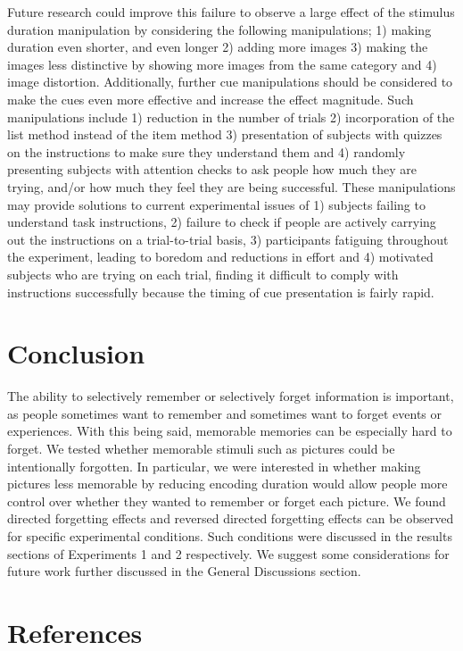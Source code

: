 \documentclass[
  english,
  man,floatsintext]{apa6}
\begin{document}
Future research could improve this failure to observe a large effect of the stimulus duration manipulation by considering the following manipulations; 1) making duration even shorter, and even longer 2) adding more images 3) making the images less distinctive by showing more images from the same category and 4) image distortion. Additionally, further cue manipulations should be considered to make the cues even more effective and increase the effect magnitude. Such manipulations include 1) reduction in the number of trials 2) incorporation of the list method instead of the item method 3) presentation of subjects with quizzes on the instructions to make sure they understand them and 4) randomly presenting subjects with attention checks to ask people how much they are trying, and/or how much they feel they are being successful. These manipulations may provide solutions to current experimental issues of 1) subjects failing to understand task instructions, 2) failure to check if people are actively carrying out the instructions on a trial-to-trial basis, 3) participants fatiguing throughout the experiment, leading to boredom and reductions in effort and 4) motivated subjects who are trying on each trial, finding it difficult to comply with instructions successfully because the timing of cue presentation is fairly rapid.

\hypertarget{conclusion}{%
\section{Conclusion}\label{conclusion}}

The ability to selectively remember or selectively forget information is important, as people sometimes want to remember and sometimes want to forget events or experiences. With this being said, memorable memories can be especially hard to forget. We tested whether memorable stimuli such as pictures could be intentionally forgotten. In particular, we were interested in whether making pictures less memorable by reducing encoding duration would allow people more control over whether they wanted to remember or forget each picture. We found directed forgetting effects and reversed directed forgetting effects can be observed for specific experimental conditions. Such conditions were discussed in the results sections of Experiments 1 and 2 respectively. We suggest some considerations for future work further discussed in the General Discussions section.

\newpage

\hypertarget{references}{%
\section{References}\label{references}}
\end{document}
